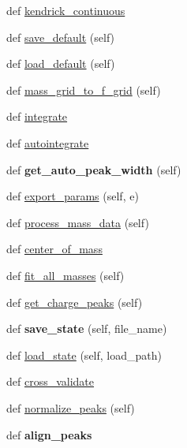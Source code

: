 \begin{DoxyCompactItemize}
\item 
def \hyperlink{class_uni_dec_1_1unidec_1_1_uni_dec_ac344ecb79f8a01cb8ecdd7459771c6be}{kendrick\+\_\+continuous}
\item 
def \hyperlink{class_uni_dec_1_1unidec_1_1_uni_dec_a78259a4b2c592f32a8b039e277f67e3c}{save\+\_\+default} (self)
\item 
def \hyperlink{class_uni_dec_1_1unidec_1_1_uni_dec_a4f1fe4dbaf59cdce231b50922ac94811}{load\+\_\+default} (self)
\item 
def \hyperlink{class_uni_dec_1_1unidec_1_1_uni_dec_ae3287b4ef1a2ede9f3c38fb027ffffea}{mass\+\_\+grid\+\_\+to\+\_\+f\+\_\+grid} (self)
\item 
def \hyperlink{class_uni_dec_1_1unidec_1_1_uni_dec_aa7e154f30f71d03e37969c012365b825}{integrate}
\item 
def \hyperlink{class_uni_dec_1_1unidec_1_1_uni_dec_afb6b4140d46c4a50f72089c4547acc33}{autointegrate}
\item 
\hypertarget{class_uni_dec_1_1unidec_1_1_uni_dec_a5c15c7af6300484007805b71b9ef6e6a}{}def {\bfseries get\+\_\+auto\+\_\+peak\+\_\+width} (self)\label{class_uni_dec_1_1unidec_1_1_uni_dec_a5c15c7af6300484007805b71b9ef6e6a}

\item 
def \hyperlink{class_uni_dec_1_1unidec_1_1_uni_dec_abc3b760ae3be4bad42acd17b24bf07fe}{export\+\_\+params} (self, e)
\item 
def \hyperlink{class_uni_dec_1_1unidec_1_1_uni_dec_a1c769a0b89a9fd023c92c560b72ff68c}{process\+\_\+mass\+\_\+data} (self)
\item 
def \hyperlink{class_uni_dec_1_1unidec_1_1_uni_dec_a95dcf60d7a9fcd406fccaddab86fb5d3}{center\+\_\+of\+\_\+mass}
\item 
def \hyperlink{class_uni_dec_1_1unidec_1_1_uni_dec_ad737c43319a27076ece8e994597ded79}{fit\+\_\+all\+\_\+masses} (self)
\item 
def \hyperlink{class_uni_dec_1_1unidec_1_1_uni_dec_a01ea6512d8b5ea226db571ea6d974b60}{get\+\_\+charge\+\_\+peaks} (self)
\item 
\hypertarget{class_uni_dec_1_1unidec_1_1_uni_dec_aadab1a0cbb4870da3c060ff5ee334fa5}{}def {\bfseries save\+\_\+state} (self, file\+\_\+name)\label{class_uni_dec_1_1unidec_1_1_uni_dec_aadab1a0cbb4870da3c060ff5ee334fa5}

\item 
def \hyperlink{class_uni_dec_1_1unidec_1_1_uni_dec_acdab5edac8a83708f248d1edf90200aa}{load\+\_\+state} (self, load\+\_\+path)
\item 
def \hyperlink{class_uni_dec_1_1unidec_1_1_uni_dec_a9e10616b1a53612c1d4456df122ebf32}{cross\+\_\+validate}
\item 
def \hyperlink{class_uni_dec_1_1unidec_1_1_uni_dec_ab51e5ec7b1f6c9b0fae1773359c3e74f}{normalize\+\_\+peaks} (self)
\item 
\hypertarget{class_uni_dec_1_1unidec_1_1_uni_dec_a88b4160d18bf6dd1f910197ce23b7e06}{}def {\bfseries align\+\_\+peaks}\label{class_uni_dec_1_1unidec_1_1_uni_dec_a88b4160d18bf6dd1f910197ce23b7e06}


\end{DoxyCompactItemize}

